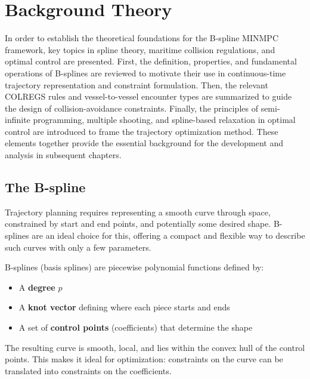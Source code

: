 
\chapter{Background Theory}\label{chap:background-theory}
In order to establish the theoretical foundations for the B-spline MINMPC framework, key topics in spline theory, maritime collision regulations, and optimal control are presented. First, the definition, properties, and fundamental operations of B-splines are reviewed to motivate their use in continuous-time trajectory representation and constraint formulation. Then, the relevant COLREGS rules and vessel-to-vessel encounter types are summarized to guide the design of collision-avoidance constraints. Finally, the principles of semi-infinite programming, multiple shooting, and spline-based relaxation in optimal control are introduced to frame the trajectory optimization method. These elements together provide the essential background for the development and analysis in subsequent chapters.



\section{The B-spline}
\label{sec:b-spline-theory}


Trajectory planning requires representing a smooth curve through space, constrained by start and end points, and potentially some desired shape. B-splines are an ideal choice for this, offering a compact and flexible way to describe such curves with only a few parameters.

B-splines (basis splines) are piecewise polynomial functions defined by:
\begin{itemize}
    \item A \textbf{degree} \( p \)
    \item A \textbf{knot vector} defining where each piece starts and ends
    \item A set of \textbf{control points} (coefficients) that determine the shape
\end{itemize}

The resulting curve is smooth, local, and lies within the convex hull of the control points. This makes it ideal for optimization: constraints on the curve can be translated into constraints on the coefficients.


